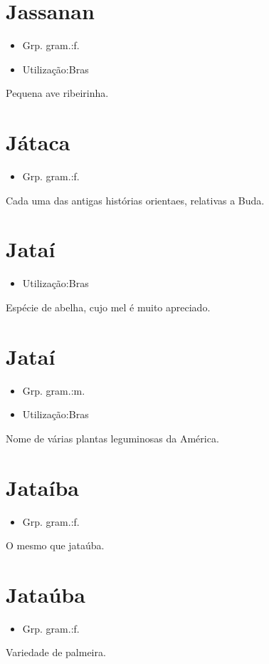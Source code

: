 \documentclass{article}
\begin{document}
\section{Jassanan}
\begin{itemize}
\item {Grp. gram.:f.}
\end{itemize}
\begin{itemize}
\item {Utilização:Bras}
\end{itemize}
Pequena ave ribeirinha.
\section{Játaca}
\begin{itemize}
\item {Grp. gram.:f.}
\end{itemize}
Cada uma das antigas histórias orientaes, relativas a Buda.
\section{Jataí}
\begin{itemize}
\item {Utilização:Bras}
\end{itemize}
Espécie de abelha, cujo mel é muito apreciado.
\section{Jataí}
\begin{itemize}
\item {Grp. gram.:m.}
\end{itemize}
\begin{itemize}
\item {Utilização:Bras}
\end{itemize}
Nome de várias plantas leguminosas da América.
\section{Jataíba}
\begin{itemize}
\item {Grp. gram.:f.}
\end{itemize}
O mesmo que \textunderscore jataúba\textunderscore .
\section{Jataúba}
\begin{itemize}
\item {Grp. gram.:f.}
\end{itemize}
Variedade de palmeira.
\end{document}
